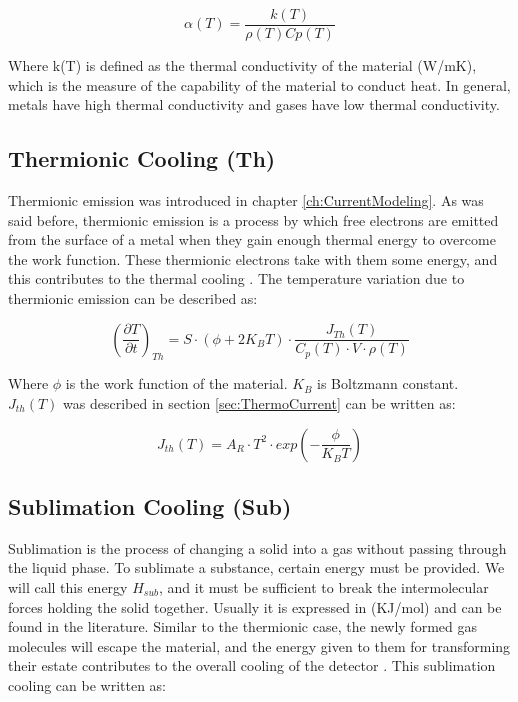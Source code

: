 \begin{equation}
    \alpha(T) = \frac{k(T)}{\rho(T)Cp(T)}
\end{equation}

Where k(T) is defined as the thermal conductivity of the material (W/mK), which is the measure of the capability of the material to conduct heat. In general, metals have high thermal conductivity and gases have low thermal conductivity. 

\subsection{Thermionic Cooling (Th)}

Thermionic emission was introduced in chapter \ref{ch:CurrentModeling}. As was said before, thermionic emission is a process by which free electrons are emitted from the surface of a metal when they gain enough thermal energy to overcome the work function. These thermionic electrons take with them some energy, and this contributes to the thermal cooling \parencite[][]{ref:ThermoCooling}. The temperature variation due to thermionic emission can be described as: 

\begin{equation}
    \left(\frac{\partial T}{\partial t}\right)_{Th} = S\cdot \left( \phi +2K_B T\right)\cdot \frac{J_{Th}(T)}{C_p(T)\cdot V \cdot \rho(T)}
\end{equation}

Where $\phi$ is the work function of the material. $K_B$ is Boltzmann constant. $J_{th} (T)$ was described in section \ref{sec:ThermoCurrent} can be written as: 

\begin{equation}
    J_{th} (T) = A_R \cdot T^2\cdot exp\left(-\frac{\phi}{K_B T}\right)
\end{equation}

\subsection{Sublimation Cooling (Sub)}

Sublimation is the process of changing a solid into a gas without passing through the liquid phase. To sublimate a substance, certain energy must be provided. We will call this energy $H_{sub}$, and it must be sufficient to break the intermolecular forces holding the solid together. Usually it is expressed in (KJ/mol) and can be found in the literature. Similar to the thermionic case, the newly formed gas molecules will escape the material, and the energy given to them for transforming their estate contributes to the overall cooling of the detector \parencite[][]{ref:SublimationCooling}. This sublimation cooling can be written as: 

